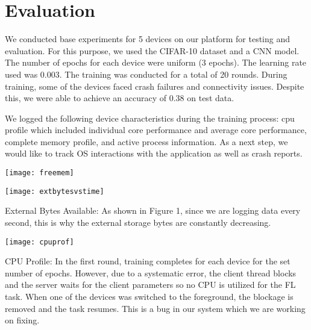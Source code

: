 \section{Evaluation}
We conducted base experiments for 5 devices on our platform for testing and evaluation. For this purpose, we used the CIFAR-10 dataset and a CNN model. The number of epochs for each device were uniform (3 epochs). The learning rate used was 0.003. The training was conducted for a total of 20 rounds. During training, some of the devices faced crash failures and connectivity issues. Despite this, we were able to achieve an accuracy of 0.38 on test data.

We logged the following device characteristics during the training process: cpu profile which included individual core performance and average core performance, complete memory profile, and active process information. As a next step, we would like to track OS interactions with the application as well as crash reports.

\texttt{[image: freemem]}

\begin{table}[h]
    \texttt{[image: extbytesvstime]}
    \caption{External Bytes Available: As shown in Figure 1, since we are logging data every second, this is why the external storage bytes are constantly decreasing.}
\end{table}

\begin{table}[H]
    \texttt{[image: cpuprof]}
    \caption{CPU Profile: In the first round, training completes for each device for the set number of epochs. However, due to a systematic error, the client thread blocks and the server waits for the client parameters so no CPU is utilized for the FL task. When one of the devices was switched to the foreground, the blockage is removed and the task resumes. This is a bug in our system which we are working on fixing.}
\end{table}